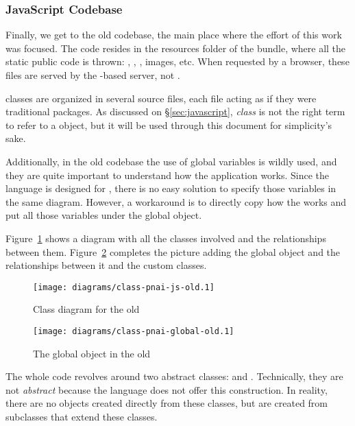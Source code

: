 \subsubsection{JavaScript Codebase} %
\label{ssub:jscodeold}

Finally, we get to the old  codebase, the main place where the effort of this work was focused.
The code resides in the resources folder of the  bundle, where all the static public code is thrown: , , , images, etc.
When requested by a browser, these files are served by the -based server, not .

 classes are organized in several source files, each file acting as if they were traditional packages.
As discussed on \S\ref{sec:javascript}, \emph{class} is not the right term to refer to a  object, but it will be used through this document for simplicity's sake.

Additionally, in the old codebase the use of global variables is wildly used, and they are quite important to understand how the application works.
Since the  language is designed for , there is no easy solution to specify those variables in the same diagram.
However, a workaround is to directly copy how the  works and put all those variables under the global  object.

Figure~\ref{fig:class-pnai-js-old} shows a diagram with all the classes involved and the relationships between them.
Figure~\ref{fig:class-pnai-global-old} completes the picture adding the global object and the relationships between it and the custom classes.

\begin{figure}[htbp]
  \centering
    \texttt{[image: diagrams/class-pnai-js-old.1]}
  \caption{Class diagram for the old }
  \label{fig:class-pnai-js-old}
\end{figure}

\begin{figure}[htbp]
  \centering
    \texttt{[image: diagrams/class-pnai-global-old.1]}
  \caption{The global  object in the old }
  \label{fig:class-pnai-global-old}
\end{figure}

The whole code revolves around two abstract classes:  and .
Technically, they are not \emph{abstract} because the  language does not offer this construction.
In reality, there are no objects created directly from these classes, but are created from subclasses that extend these classes.

